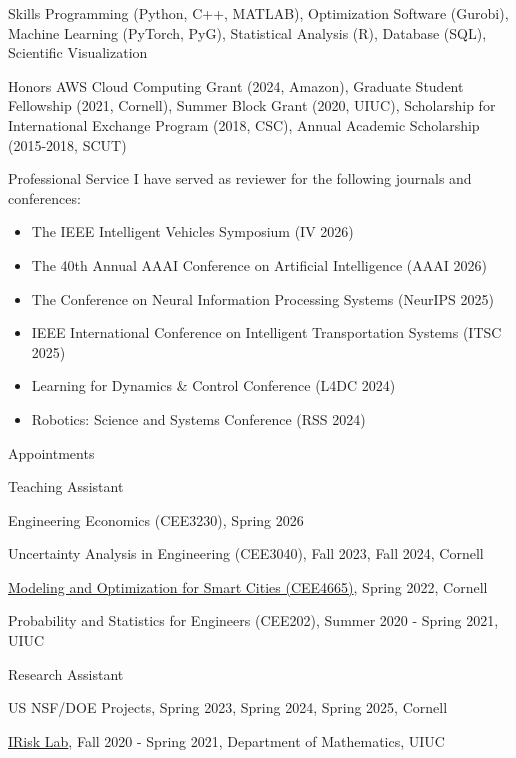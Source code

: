 \documentclass{resume} %
\begin{document}
\begin{rSection}{Skills}
Programming (Python, C++, MATLAB), Optimization Software (Gurobi), Machine Learning (PyTorch, PyG), Statistical Analysis (R), Database (SQL), Scientific Visualization
\end{rSection}

\begin{rSection}{Honors}
AWS Cloud Computing Grant (2024, Amazon), Graduate Student Fellowship (2021, Cornell), Summer Block Grant (2020, UIUC),  Scholarship for International Exchange Program (2018, CSC), Annual Academic Scholarship (2015-2018, SCUT)
\end{rSection}

\begin{rSection}{Professional Service}
I have served as reviewer for the following journals and conferences:
\begin{itemize}
    \renewcommand{\labelitemi}{-}
    \item The IEEE Intelligent Vehicles Symposium (IV 2026)
    \item The 40th Annual AAAI Conference on Artificial Intelligence (AAAI 2026)
    \item The Conference on Neural Information Processing Systems (NeurIPS 2025) 
    \item IEEE International Conference on Intelligent Transportation Systems (ITSC 2025)
    \item Learning for Dynamics \& Control Conference (L4DC 2024)
    \item Robotics: Science and Systems Conference (RSS 2024)
\end{itemize}
\end{rSection}

\begin{rSection}{Appointments}
\begin{rSubsection}{Teaching Assistant}{}{}{}
    \item Engineering Economics (CEE3230), Spring 2026
    \item Uncertainty Analysis in Engineering (CEE3040), Fall 2023, Fall 2024, Cornell
    \item \href{https://classes.cornell.edu/browse/roster/SP22/class/CEE/4665}{Modeling and Optimization for Smart Cities (CEE4665)}, Spring 2022, Cornell
    \item Probability and Statistics for Engineers (CEE202), Summer 2020 - Spring 2021, UIUC
\end{rSubsection}
\begin{rSubsection}{Research Assistant}{}{}{}
    \item US NSF/DOE Projects, Spring 2023, Spring 2024, Spring 2025, Cornell 
    \item\href{https://math.illinois.edu /illinois-risk-lab/home}{IRisk Lab},  Fall 2020 - Spring 2021, Department of Mathematics, UIUC
\end{rSubsection}
\end{rSection}
\end{document}
